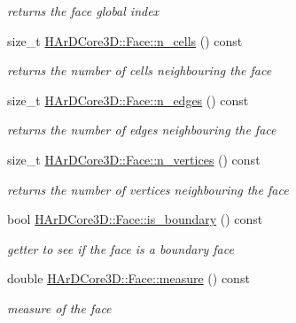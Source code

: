 \begin{DoxyCompactItemize}
\begin{DoxyCompactList}\small\item\em returns the face global index \end{DoxyCompactList}\item 
\mbox{\label{group__Mesh_ga5407c36b8a6d8d8bf64e8fd559cebbe9}} 
size\+\_\+t \hyperlink{group__Mesh_ga5407c36b8a6d8d8bf64e8fd559cebbe9}{H\+Ar\+D\+Core3\+D\+::\+Face\+::n\+\_\+cells} () const
\begin{DoxyCompactList}\small\item\em returns the number of cells neighbouring the face \end{DoxyCompactList}\item 
\mbox{\label{group__Mesh_gaab27135cdfd18bc7dae7f01715a4edc6}} 
size\+\_\+t \hyperlink{group__Mesh_gaab27135cdfd18bc7dae7f01715a4edc6}{H\+Ar\+D\+Core3\+D\+::\+Face\+::n\+\_\+edges} () const
\begin{DoxyCompactList}\small\item\em returns the number of edges neighbouring the face \end{DoxyCompactList}\item 
\mbox{\label{group__Mesh_ga50edc49af3d9f7433e238e9d18f7f11c}} 
size\+\_\+t \hyperlink{group__Mesh_ga50edc49af3d9f7433e238e9d18f7f11c}{H\+Ar\+D\+Core3\+D\+::\+Face\+::n\+\_\+vertices} () const
\begin{DoxyCompactList}\small\item\em returns the number of vertices neighbouring the face \end{DoxyCompactList}\item 
\mbox{\label{group__Mesh_ga8f69df15c3c76b4f80f51231ede670f5}} 
bool \hyperlink{group__Mesh_ga8f69df15c3c76b4f80f51231ede670f5}{H\+Ar\+D\+Core3\+D\+::\+Face\+::is\+\_\+boundary} () const
\begin{DoxyCompactList}\small\item\em getter to see if the face is a boundary face \end{DoxyCompactList}\item 
\mbox{\label{group__Mesh_gad8284631ae078f8f5a15147b7b1014a1}} 
double \hyperlink{group__Mesh_gad8284631ae078f8f5a15147b7b1014a1}{H\+Ar\+D\+Core3\+D\+::\+Face\+::measure} () const
\begin{DoxyCompactList}\small\item\em measure of the face \end{DoxyCompactList}\item 

\end{DoxyCompactItemize}
